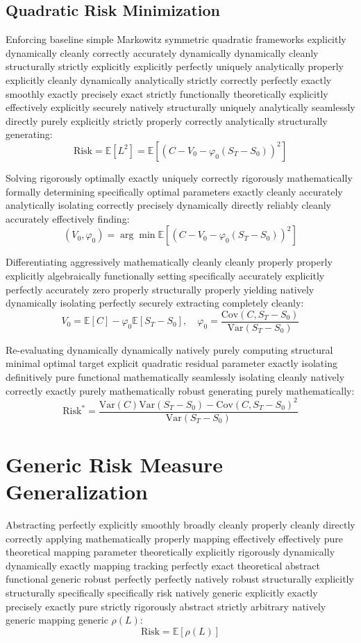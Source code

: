 \subsection{Quadratic Risk Minimization}

Enforcing baseline simple Markowitz symmetric quadratic frameworks explicitly dynamically cleanly correctly accurately dynamically dynamically cleanly structurally strictly explicitly explicitly perfectly uniquely analytically properly explicitly cleanly dynamically analytically strictly correctly perfectly exactly smoothly exactly precisely exact strictly functionally theoretically explicitly effectively explicitly securely natively structurally uniquely analytically seamlessly directly purely explicitly strictly properly correctly analytically structurally generating:
$$
\text{Risk} = \mathbb{E}[L^2] = \mathbb{E}[ (C - V_0 - \varphi_0(S_T - S_0))^2 ]
$$

Solving rigorously optimally exactly uniquely correctly rigorously mathematically formally determining specifically optimal parameters exactly cleanly accurately analytically isolating correctly precisely dynamically directly reliably cleanly accurately effectively finding:
$$
(V_0, \varphi_0) = \arg\min \mathbb{E}[(C - V_0 - \varphi_0(S_T - S_0))^2]
$$

Differentiating aggressively mathematically cleanly cleanly properly properly explicitly algebraically functionally setting specifically accurately explicitly perfectly accurately zero properly structurally properly yielding natively dynamically isolating perfectly securely extracting completely cleanly:
$$
V_0 = \mathbb{E}[C] - \varphi_0 \mathbb{E}[S_T - S_0], \quad \varphi_0 = \frac{\text{Cov}(C, S_T - S_0)}{\text{Var}(S_T - S_0)}
$$

Re-evaluating dynamically dynamically natively purely computing structural minimal optimal target explicit quadratic residual parameter exactly isolating definitively pure functional mathematically seamlessly isolating cleanly natively correctly exactly purely mathematically robust generating purely mathematically:
$$
\text{Risk}^* = \frac{\text{Var}(C)\text{Var}(S_T - S_0) - \text{Cov}(C, S_T - S_0)^2}{\text{Var}(S_T - S_0)}
$$

\section{Generic Risk Measure Generalization}

Abstracting perfectly explicitly smoothly broadly cleanly properly cleanly directly correctly applying mathematically properly mapping effectively effectively pure theoretical mapping parameter theoretically explicitly rigorously dynamically dynamically exactly mapping tracking perfectly exact theoretical abstract functional generic robust perfectly perfectly natively robust structurally explicitly structurally specifically specifically risk natively generic explicitly exactly precisely exactly pure strictly rigorously abstract strictly arbitrary natively generic mapping generic $\rho(L)$:
$$
\text{Risk} = \mathbb{E}[\rho(L)]
$$

